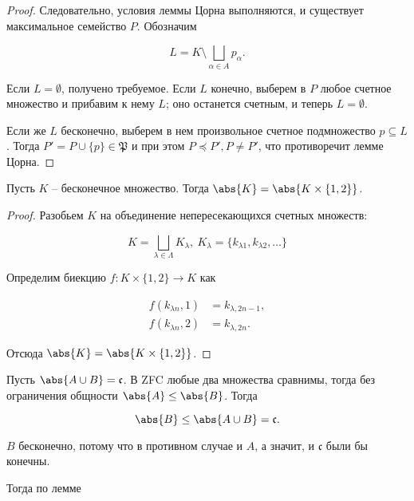 \begin{proof}
			Следовательно, условия леммы Цорна выполняются, и существует максимальное семейство $P$. Обозначим

			\begin{equation*}
				L = K \setminus \bigsqcup_{\alpha \in A} p_\alpha.
			\end{equation*}

			Если $L = \emptyset$, получено требуемое. Если $L$ конечно, выберем в $P$ любое счетное множество и прибавим к нему $L$; оно останется счетным, и теперь $L = \emptyset$.

			Если же $L$ бесконечно, выберем в нем произвольное счетное подмножество $p \subseteq L$. Тогда $P' = P \cup \{p\} \in \mathfrak{P}$ и при этом $P \preceq P', P \ne P'$, что противоречит лемме Цорна.
		\end{proof}

		\begin{lemma}
			Пусть $K$ -- бесконечное множество. Тогда $\abs{K} = \abs{K \times \{1, 2\}}$.
		\end{lemma}

		\begin{proof}
			Разобьем $K$ на объединение непересекающихся счетных множеств:

			\begin{equation*}
				K = \bigsqcup_{\lambda \in \Lambda} K_\lambda, \ K_\lambda = \{ k_{\lambda1}, k_{\lambda2}, \dots \}
			\end{equation*}

			Определим биекцию $f: K \times \{1, 2\} \to K$ как

			\begin{align*}
				f(k_{\lambda n}, 1) &= k_{\lambda, 2n-1}, \\
				f(k_{\lambda n}, 2) &= k_{\lambda, 2n}.
			\end{align*}

			Отсюда $\abs{K} = \abs{K \times \{1, 2\}}$.
		\end{proof}

		Пусть $\abs{A \cup B} = \mathfrak{c}$. В ZFC любые два множества сравнимы, тогда без ограничения общности $\abs{A} \le \abs{B}$. Тогда

		\begin{equation*}
			\abs{B} \le \abs{A \cup B} = \mathfrak{c}.
		\end{equation*}

		$B$ бесконечно, потому что в противном случае и $A$, а значит, и $\mathfrak{c}$ были бы конечны.

		Тогда по лемме


